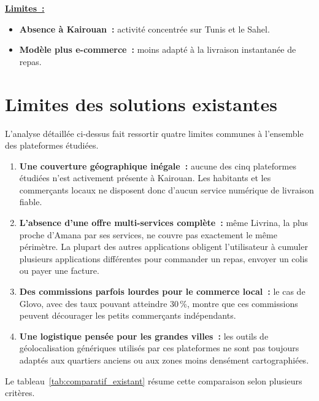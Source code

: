 \documentclass[12pt,fleqn,a4paper]{report}
\begin{document}
\begin{justify}
\vspace{0.2cm}
\noindent \textbf{\underline{Limites~:}}
\begin{itemize}
    \item \textbf{Absence à Kairouan~:} activité concentrée sur Tunis et le Sahel.
    \item \textbf{Modèle plus e-commerce~:} moins adapté à la livraison instantanée de repas.
\end{itemize}

\section{Limites des solutions existantes}

L'analyse détaillée ci-dessus fait ressortir quatre limites communes à l'ensemble des plateformes étudiées.

\begin{enumerate}
    \item \textbf{Une couverture géographique inégale~:} aucune des cinq plateformes étudiées n'est activement présente à Kairouan. Les habitants et les commerçants locaux ne disposent donc d'aucun service numérique de livraison fiable.
    \item \textbf{L'absence d'une offre multi-services complète~:} même Livrina, la plus proche d'Amana par ses services, ne couvre pas exactement le même périmètre. La plupart des autres applications obligent l'utilisateur à cumuler plusieurs applications différentes pour commander un repas, envoyer un colis ou payer une facture.
    \item \textbf{Des commissions parfois lourdes pour le commerce local~:} le cas de Glovo, avec des taux pouvant atteindre 30\,\%, montre que ces commissions peuvent décourager les petits commerçants indépendants.
    \item \textbf{Une logistique pensée pour les grandes villes~:} les outils de géolocalisation génériques utilisés par ces plateformes ne sont pas toujours adaptés aux quartiers anciens ou aux zones moins densément cartographiées.
\end{enumerate}

Le tableau~\ref{tab:comparatif_existant} résume cette comparaison selon plusieurs critères.


\end{justify}
\end{document}
